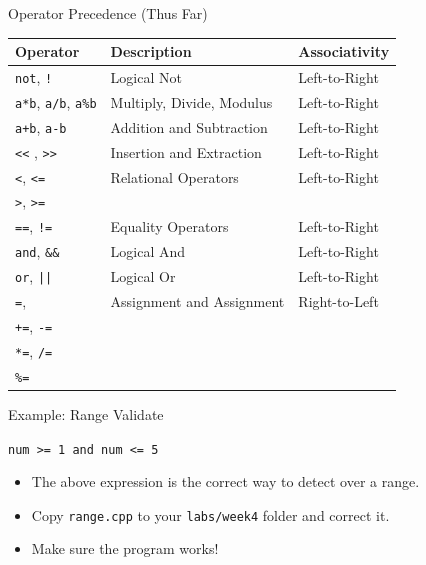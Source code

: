 \documentclass[]{beamer}
\begin{document}
\begin{frame}{Operator Precedence (Thus Far)}
    \begin{tabular}{|l|l|l|}
        \hline
        \textbf{Operator} & \textbf{Description} & \textbf{Associativity} \\
        \hline
        \texttt{not}, \texttt{!} & Logical Not & Left-to-Right\\
        \hline
        \texttt{a*b}, \texttt{a/b}, \texttt{a\%b} & Multiply, Divide, Modulus & Left-to-Right\\
        \hline
        \texttt{a+b}, \texttt{a-b} & Addition and Subtraction & Left-to-Right\\
        \hline
        \texttt{<<} , \texttt{>>} & Insertion and Extraction & Left-to-Right \\
        \hline
        \texttt{<}, \texttt{<=} & Relational Operators & Left-to-Right\\
        \texttt{>}, \texttt{>=} & & \\
        \hline
        \texttt{==}, \texttt{!=} & Equality Operators & Left-to-Right\\
        \hline
        \texttt{and}, \texttt{\&\&} & Logical And & Left-to-Right\\
        \hline
        \texttt{or}, \texttt{||} & Logical Or & Left-to-Right\\
        \hline
        \texttt{=},  & Assignment and Assignment & Right-to-Left \\
        \texttt{+=}, \texttt{-=} & & \\
        \texttt{*=}, \texttt{/=} & & \\
        \texttt{\%=} & & \\
        \hline
    \end{tabular}
\end{frame}


\begin{frame}{Example: Range Validate}
  \begin{center}
      \texttt{num >= 1 and num <= 5}
  \end{center}
  \begin{itemize}[<+->]
      \item The above expression is the correct way to detect over a range.
      \item Copy \texttt{range.cpp} to your \texttt{labs/week4} folder and correct it.
      \item Make sure the program works!
  \end{itemize}
\end{frame}
\end{document}

